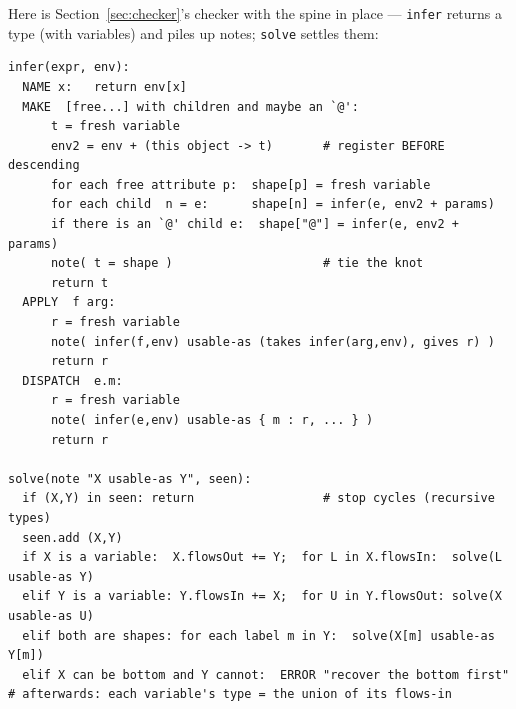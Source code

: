 \documentclass[10pt]{article}
\begin{document}
Here is Section~\ref{sec:checker}'s checker with the spine in place ---
\verb|infer| returns a type (with variables) and piles up notes; \verb|solve|
settles them:
\begin{lstlisting}
infer(expr, env):
  NAME x:   return env[x]
  MAKE  [free...] with children and maybe an `@':
      t = fresh variable
      env2 = env + (this object -> t)       # register BEFORE descending
      for each free attribute p:  shape[p] = fresh variable
      for each child  n = e:      shape[n] = infer(e, env2 + params)
      if there is an `@' child e:  shape["@"] = infer(e, env2 + params)
      note( t = shape )                     # tie the knot
      return t
  APPLY  f arg:
      r = fresh variable
      note( infer(f,env) usable-as (takes infer(arg,env), gives r) )
      return r
  DISPATCH  e.m:
      r = fresh variable
      note( infer(e,env) usable-as { m : r, ... } )
      return r

solve(note "X usable-as Y", seen):
  if (X,Y) in seen: return                  # stop cycles (recursive types)
  seen.add (X,Y)
  if X is a variable:  X.flowsOut += Y;  for L in X.flowsIn:  solve(L usable-as Y)
  elif Y is a variable: Y.flowsIn += X;  for U in Y.flowsOut: solve(X usable-as U)
  elif both are shapes: for each label m in Y:  solve(X[m] usable-as Y[m])
  elif X can be bottom and Y cannot:  ERROR "recover the bottom first"
# afterwards: each variable's type = the union of its flows-in
\end{lstlisting}
\end{document}
